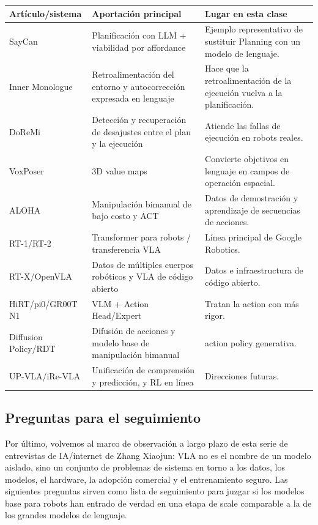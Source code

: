 \noindent\begin{tabularx}{\textwidth}{p{}p{}X}
\toprule
Artículo/sistema & Aportación principal & Lugar en esta clase \\
\midrule
SayCan & Planificación con LLM + viabilidad por affordance & Ejemplo representativo de sustituir Planning con un modelo de lenguaje. \\
Inner Monologue & Retroalimentación del entorno y autocorrección expresada en lenguaje & Hace que la retroalimentación de la ejecución vuelva a la planificación. \\
DoReMi & Detección y recuperación de desajustes entre el plan y la ejecución & Atiende las fallas de ejecución en robots reales. \\
VoxPoser & 3D value maps & Convierte objetivos en lenguaje en campos de operación espacial. \\
ALOHA & Manipulación bimanual de bajo costo y ACT & Datos de demostración y aprendizaje de secuencias de acciones. \\
RT-1/RT-2 & Transformer para robots / transferencia VLA & Línea principal de Google Robotics. \\
RT-X/OpenVLA & Datos de múltiples cuerpos robóticos y VLA de código abierto & Datos e infraestructura de código abierto. \\
HiRT/pi0/GR00T N1 & VLM + Action Head/Expert & Tratan la action con más rigor. \\
Diffusion Policy/RDT & Difusión de acciones y modelo base de manipulación bimanual & action policy generativa. \\
UP-VLA/iRe-VLA & Unificación de comprensión y predicción, y RL en línea & Direcciones futuras. \\
\bottomrule
\end{tabularx}

\subsection{Preguntas para el seguimiento}

Por último, volvemos al marco de observación a largo plazo de esta serie de entrevistas de IA/internet de Zhang Xiaojun: VLA no es el nombre de un modelo aislado, sino un conjunto de problemas de sistema en torno a los datos, los modelos, el hardware, la adopción comercial y el entrenamiento seguro. Las siguientes preguntas sirven como lista de seguimiento para juzgar si los modelos base para robots han entrado de verdad en una etapa de scale comparable a la de los grandes modelos de lenguaje.

